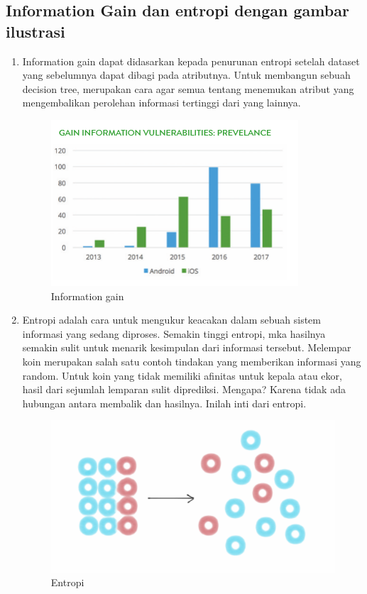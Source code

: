 \subsection{Information Gain dan entropi dengan gambar ilustrasi}
\begin{enumerate}
\item Information gain dapat didasarkan kepada penurunan entropi setelah dataset yang sebelumnya dapat dibagi pada atributnya. Untuk membangun sebuah decision tree, merupakan cara agar semua tentang menemukan atribut yang mengembalikan perolehan informasi tertinggi dari yang lainnya.
\begin{figure}[ht]
\centering
\includegraphics[scale=0.5]{figures/8mrdt.png}
\caption{Information gain}
\label{contoh}
\end{figure}
\item Entropi adalah cara untuk mengukur keacakan dalam sebuah sistem informasi yang sedang diproses. Semakin tinggi entropi, mka hasilnya semakin sulit untuk menarik kesimpulan dari informasi tersebut. Melempar koin merupakan salah satu contoh tindakan yang memberikan informasi yang random. Untuk koin yang tidak memiliki afinitas untuk kepala atau ekor, hasil dari sejumlah lemparan sulit diprediksi. Mengapa? Karena tidak ada hubungan antara membalik dan hasilnya. Inilah inti dari entropi.
\begin{figure}[ht]
\centering
\includegraphics[scale=0.5]{figures/9mrdt.png}
\caption{Entropi}
\label{contoh}
\end{figure}
\end{enumerate}


